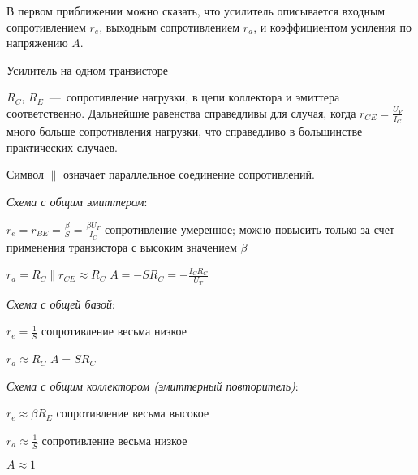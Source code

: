\documentclass[
a4paper
,11pt
,landscape
,russian
,twocolumn
]{letter}
\begin{document}
В первом приближении можно сказать, что усилитель описывается
входным сопротивлением $r_e$, выходным сопротивлением $r_a$, и
коэффициентом усиления по напряжению $A$.

\vspace{.2in}

\begin{Large}
Усилитель на одном транзисторе
\end{Large}

\vspace{.2in}

$R_C$, $R_E$~---~сопротивление нагрузки, в цепи коллектора и
эмиттера соответственно. Дальнейшие равенства справедливы для
случая, когда $r_{CE}=\frac{U_Y}{I_C}$ много больше сопротивления
нагрузки, что справедливо в большинстве практических случаев.

Символ $\|$ означает параллельное соединение сопротивлений.

\vspace{.2in}

\begin{raggedright}

\textit{Схема с общим эмиттером}:

$r_e=r_{BE}=\frac{\beta}{S}=\frac{\beta U_T}{I_C}$
\tabto{2in}
{\small сопротивление умеренное; можно повысить}
\linebreak
\tabto{2in}
{\small только за счет применения транзистора}
\linebreak
\tabto{2in}
{\small с высоким значением} $\beta$

$r_a=R_C\|r_{CE}\approx R_C$
\hspace{.2in}
$A=-S R_C=-\frac{I_C R_C}{U_T}$

\vspace{.2in}

\textit{Схема с общей базой}:

$r_e=\frac{1}{S}$
\tabto{2in}
{\small сопротивление весьма низкое}

$r_a\approx R_C$
\hspace{.2in}
$A=S R_C$

\vspace{.2in}

\textit{Схема с общим коллектором (эмиттерный повторитель)}:

$r_e\approx\beta R_E$
\tabto{2in}
{\small сопротивление весьма высокое}

$r_a\approx\frac{1}{S}$
\tabto{2in}
{\small сопротивление весьма низкое}

$A\approx 1$

\end{raggedright}
\end{document}
